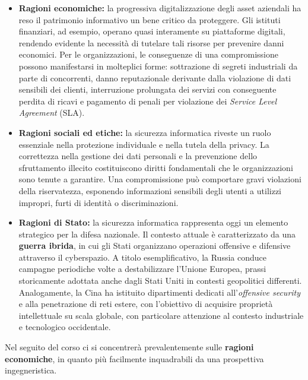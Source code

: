 \documentclass[../../main.tex]{subfiles}
\begin{document}
\begin{itemize}
    \item \textbf{Ragioni economiche:} la progressiva digitalizzazione degli asset aziendali ha reso il patrimonio informativo un bene critico da proteggere. Gli istituti finanziari, ad esempio, operano quasi interamente su piattaforme digitali, rendendo evidente la necessità di tutelare tali risorse per prevenire danni economici. Per le organizzazioni, le conseguenze di una compromissione possono manifestarsi in molteplici forme: sottrazione di segreti industriali da parte di concorrenti, danno reputazionale derivante dalla violazione di dati sensibili dei clienti, interruzione prolungata dei servizi con conseguente perdita di ricavi e pagamento di penali per violazione dei \textit{Service Level Agreement} (SLA).
    
    \item \textbf{Ragioni sociali ed etiche:} la sicurezza informatica riveste un ruolo essenziale nella protezione individuale e nella tutela della privacy. La correttezza nella gestione dei dati personali e la prevenzione dello sfruttamento illecito costituiscono diritti fondamentali che le organizzazioni sono tenute a garantire. Una compromissione può comportare gravi violazioni della riservatezza, esponendo informazioni sensibili degli utenti a utilizzi impropri, furti di identità o discriminazioni.
    
    \item \textbf{Ragioni di Stato:} la sicurezza informatica rappresenta oggi un elemento strategico per la difesa nazionale. Il contesto attuale è caratterizzato da una \textbf{guerra ibrida}, in cui gli Stati organizzano operazioni offensive e difensive attraverso il cyberspazio. A titolo esemplificativo, la Russia conduce campagne periodiche volte a destabilizzare l'Unione Europea, prassi storicamente adottata anche dagli Stati Uniti in contesti geopolitici differenti. Analogamente, la Cina ha istituito dipartimenti dedicati all'\textit{offensive security} e alla penetrazione di reti estere, con l'obiettivo di acquisire proprietà intellettuale su scala globale, con particolare attenzione al contesto industriale e tecnologico occidentale.
\end{itemize}

Nel seguito del corso ci si concentrerà prevalentemente sulle \textbf{ragioni economiche}, in quanto più facilmente inquadrabili da una prospettiva ingegneristica.
\end{document}
